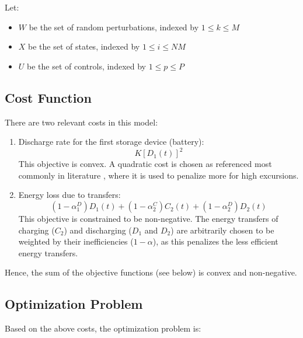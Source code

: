 \documentclass[conference]{IEEEtran}
\begin{document}
Let:
\begin{itemize}
	\item $W$ be the set of random perturbations, indexed by $1\leq k \leq M$
	\item $X$ be the set of states, indexed by $1\leq i \leq NM$
	\item $U$ be the set of controls, indexed by $1\leq p \leq P$
\end{itemize}

\subsection{Cost Function}
There are two relevant costs in this model:
\begin{enumerate}
    \item Discharge rate for the first storage device (battery):
	\begin{equation}K\left[D_{1}(t)\right]^{2}\end{equation}
	This objective is convex. A quadratic cost is chosen as referenced most commonly in literature \cite{bambang2014energy}, where it is used to penalize more for high excursions.
	\item Energy loss due to transfers:
	\begin{equation}
        (1-\alpha_{1}^{D})D_{1}(t)+(1-\alpha_{2}^{C})C_{2}(t)+(1-\alpha_{2}^{D})D_{2}(t)
	\end{equation}
	This objective is constrained to be non-negative. The energy transfers of charging ($C_{2}$) and discharging ($D_{1}$ and $D_{2}$) are arbitrarily chosen to be weighted by their inefficiencies ($1-\alpha$), as this penalizes the less efficient energy transfers.
\end{enumerate}

Hence, the sum of the objective functions (see below) is convex and non-negative.

\subsection{Optimization Problem}
Based on the above costs, the optimization problem is:
\end{document}
